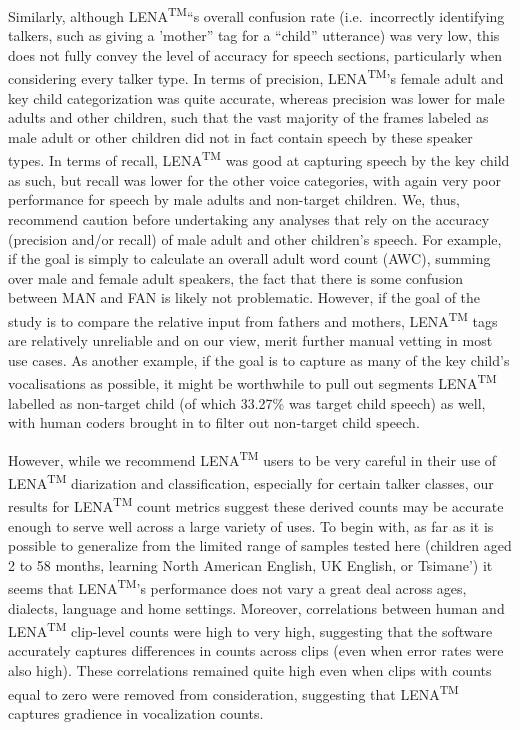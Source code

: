 \documentclass[english,table,man,floatsintext]{apa6}
\begin{document}
Similarly, although LENA\textsuperscript{TM}\enquote{s overall confusion rate (i.e.~incorrectly identifying talkers, such as giving a 'mother} tag for a \enquote{child} utterance) was very low, this does not fully convey the level of accuracy for speech sections, particularly when considering every talker type. In terms of precision, LENA\textsuperscript{TM}'s female adult and key child categorization was quite accurate, whereas precision was lower for male adults and other children, such that the vast majority of the frames labeled as male adult or other children did not in fact contain speech by these speaker types. In terms of recall, LENA\textsuperscript{TM} was good at capturing speech by the key child as such, but recall was lower for the other voice categories, with again very poor performance for speech by male adults and non-target children. We, thus, recommend caution before undertaking any analyses that rely on the accuracy (precision and/or recall) of male adult and other children's speech. For example, if the goal is simply to calculate an overall adult word count (AWC), summing over male and female adult speakers, the fact that there is some confusion between MAN and FAN is likely not problematic. However, if the goal of the study is to compare the relative input from fathers and mothers, LENA\textsuperscript{TM} tags are relatively unreliable and on our view, merit further manual vetting in most use cases. As another example, if the goal is to capture as many of the key child's vocalisations as possible, it might be worthwhile to pull out segments LENA\textsuperscript{TM} labelled as non-target child (of which 33.27\% was target child speech) as well, with human coders brought in to filter out non-target child speech.

However, while we recommend LENA\textsuperscript{TM} users to be very careful in their use of LENA\textsuperscript{TM} diarization and classification, especially for certain talker classes, our results for LENA\textsuperscript{TM} count metrics suggest these derived counts may be accurate enough to serve well across a large variety of uses. To begin with, as far as it is possible to generalize from the limited range of samples tested here (children aged 2 to 58 months, learning North American English, UK English, or Tsimane') it seems that LENA\textsuperscript{TM}'s performance does not vary a great deal across ages, dialects, language and home settings. Moreover, correlations between human and LENA\textsuperscript{TM} clip-level counts were high to very high, suggesting that the software accurately captures differences in counts across clips (even when error rates were also high). These correlations remained quite high even when clips with counts equal to zero were removed from consideration, suggesting that LENA\textsuperscript{TM} captures gradience in vocalization counts.
\end{document}

